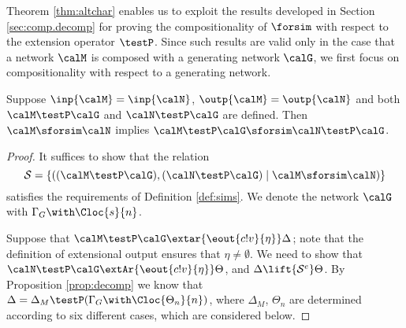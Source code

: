 \documentclass{LMCS}
\begin{document}
\noindent Theorem \ref{thm:altchar} enables us to exploit the results 
developed in Section \ref{sec:comp.decomp} for proving 
the compositionality of $\forsim$ with respect to the 
extension operator $\testP$. Since such results are valid 
only in the case that a network $\calM$ is composed
 with a generating network 
$\calG$, we first focus on compositionality with respect 
to a generating network.

\begin{thm}\label{thm:single.comp}
  Suppose $\inp{\calM} = \inp{\calN}$, $\outp{\calM} = \outp{\calN}$ 
  and both $\calM \testP \calG$ and 
$\calN \testP \calG$ are defined. Then 
$\calM \sforsim \calN $ implies 
$\calM \testP \calG  \sforsim \calN \testP \calG$.
\end{thm}

\begin{proof}
It suffices to show that the relation 
\[
{\mathcal S} = \{ ((\calM \testP \calG), (\calN \testP \calG) \;|\; \calM \sforsim \calN) \} 
\]
\noindent
satisfies the requirements of Definition \ref{def:sims}. 
We denote the network $\calG$ with $\Gamma_G \with \Cloc{s}{n}$. 


Suppose that $\calM \testP \calG \extar{\eout{c!v}{\eta}} \Delta$; 
note that the definition of extensional output ensures that 
$\eta \neq \emptyset$.
We need to show that $\calN \testP \calG \extAr{\eout{c!v}{\eta}} 
\Theta$, and $\Delta \lift{{\mathcal S}^e} \Theta$. By 
Proposition \ref{prop:decomp} we know that 
$\Delta = \Delta_M \testP (\Gamma_G \with \Cloc{\Theta_n}{n})$, 
where $\Delta_M$, $\Theta_n$ are determined according to 
six different cases, which are considered below.


\end{proof}
\end{document}
